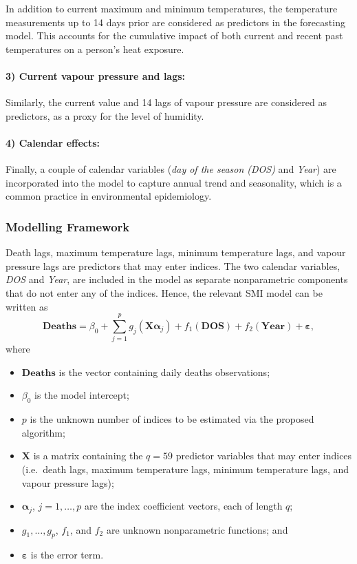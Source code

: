 \documentclass[
  11pt,
  a4paper,
]{article}
\providecommand{\tightlist}{%
  \setlength{\itemsep}{0pt}\setlength{\parskip}{0pt}}\usepackage{longtable,booktabs,array}
\begin{document}
In addition to current maximum and minimum temperatures, the temperature
measurements up to 14 days prior are considered as predictors in the
forecasting model. This accounts for the cumulative impact of both
current and recent past temperatures on a person's heat exposure.

\paragraph{3) Current vapour pressure and
lags:}\label{current-vapour-pressure-and-lags}

Similarly, the current value and 14 lags of vapour pressure are
considered as predictors, as a proxy for the level of humidity.

\paragraph{4) Calendar effects:}\label{calendar-effects}

Finally, a couple of calendar variables (\emph{day of the season (DOS)}
and \emph{Year}) are incorporated into the model to capture annual trend
and seasonality, which is a common practice in environmental
epidemiology.

\subsubsection{Modelling Framework}\label{modelling-framework}

Death lags, maximum temperature lags, minimum temperature lags, and
vapour pressure lags are predictors that may enter indices. The two
calendar variables, \emph{DOS} and \emph{Year}, are included in the
model as separate nonparametric components that do not enter any of the
indices. Hence, the relevant SMI model can be written as \[
  \textbf{Deaths} = \beta_{0} + \sum_{j = 1}^{p}{g_{j}(\bm{X}\bm{\alpha}_{j})} + f_{1}(\textbf{DOS}) + f_{2}(\textbf{Year})+ \bm{\varepsilon},
\] where

\begin{itemize}
\tightlist
\item
  \(\textbf{Deaths}\) is the vector containing daily deaths
  observations;
\item
  \(\beta_{0}\) is the model intercept;
\item
  \(p\) is the unknown number of indices to be estimated via the
  proposed algorithm;
\item
  \(\bm{X}\) is a matrix containing the \(q=59\) predictor variables
  that may enter indices (i.e.~death lags, maximum temperature lags,
  minimum temperature lags, and vapour pressure lags);
\item
  \(\bm{\alpha}_{j}\), \(j = 1, \dots, p\) are the index coefficient
  vectors, each of length \(q\);
\item
  \(g_{1}, \dots,g_p\), \(f_{1}\), and \(f_{2}\) are unknown
  nonparametric functions; and
\item
  \(\bm{\varepsilon}\) is the error term.
\end{itemize}
\end{document}
